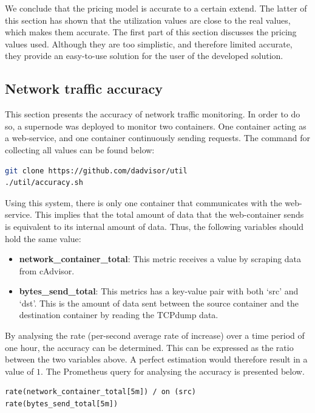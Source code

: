 \noindent 
We conclude that the pricing model is accurate to a certain extend. The latter of this section has shown that the utilization values are close to the real values, which makes them accurate. The first part of this section discusses the pricing values used. Although they are too simplistic, and therefore limited accurate, they provide an easy-to-use solution for the user of the developed solution.

\subsection{Network traffic accuracy} \label{sec:eval_k}
This section presents the accuracy of network traffic monitoring. In order to do so, a supernode was deployed to monitor two containers. One container acting as a web-service, and one container continuously sending requests. The command for collecting all values can be found below:

\begin{lstlisting}[language=bash, caption=Docker-compose]
git clone https://github.com/dadvisor/util
./util/accuracy.sh
\end{lstlisting}

\noindent
Using this system, there is only one container that communicates with the web-service. This implies that the total amount of data that the web-container sends is equivalent to its internal amount of data. Thus, the following variables should hold the same value:
\begin{itemize}
    \item \textbf{network\_container\_total}: This metric receives a value by scraping data from cAdvisor.
    \item \textbf{bytes\_send\_total}: This metrics has a key-value pair with both `src' and `dst'. This is the amount of data sent between the source container and the destination container by reading the TCPdump data.
\end{itemize}

\noindent
By analysing the rate (per-second average rate of increase) over a time period of one hour, the accuracy can be determined. This can be expressed as the ratio between the two variables above. A perfect estimation would therefore result in a value of $1$. The Prometheus query for analysing the accuracy is presented below.

\begin{verbatim}
rate(network_container_total[5m]) / on (src) 
rate(bytes_send_total[5m])
\end{verbatim}


